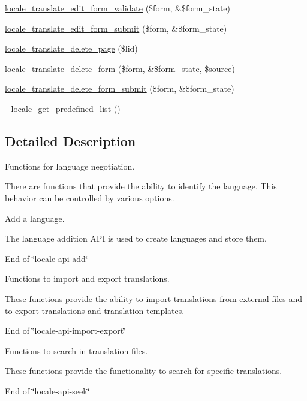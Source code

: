 \begin{DoxyCompactItemize}
\hyperlink{group__locale_ga93fc48be446148e648c9a1d0f630726e}{locale\_\-translate\_\-edit\_\-form\_\-validate} (\$form, \&\$form\_\-state)
\item 
\hyperlink{group__locale_gadbeab4019dcbf389a12af893cdaad5d5}{locale\_\-translate\_\-edit\_\-form\_\-submit} (\$form, \&\$form\_\-state)
\item 
\hyperlink{group__locale_gade9664489526c09d68def1897631f4fa}{locale\_\-translate\_\-delete\_\-page} (\$lid)
\item 
\hyperlink{group__locale_gaf40a5c539ee94ae8b089275bf74e1bfe}{locale\_\-translate\_\-delete\_\-form} (\$form, \&\$form\_\-state, \$source)
\item 
\hyperlink{group__locale_ga26d7aa049b06d9de384175698f5761c7}{locale\_\-translate\_\-delete\_\-form\_\-submit} (\$form, \&\$form\_\-state)
\end{DoxyCompactItemize}
\label{_amgrpd41d8cd98f00b204e9800998ecf8427e}
 \begin{DoxyCompactItemize}
\item 
\hyperlink{group__locale_gafac9d59fd436286a3f3738140ce96e82}{\_\-locale\_\-get\_\-predefined\_\-list} ()
\end{DoxyCompactItemize}


\subsection{Detailed Description}
Functions for language negotiation.

There are functions that provide the ability to identify the language. This behavior can be controlled by various options.

Add a language.

The language addition API is used to create languages and store them.

End of \char`\"{}locale-\/api-\/add\char`\"{}

Functions to import and export translations.

These functions provide the ability to import translations from external files and to export translations and translation templates.

End of \char`\"{}locale-\/api-\/import-\/export\char`\"{}

Functions to search in translation files.

These functions provide the functionality to search for specific translations.

End of \char`\"{}locale-\/api-\/seek\char`\"{}

